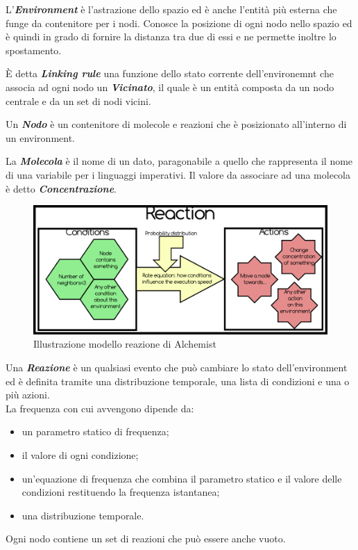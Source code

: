 L'\textbf{\textit{Environment}} \`e l'astrazione dello spazio ed \`e anche l'entit\`a pi\`u esterna che funge da contenitore per i nodi. Conosce la posizione di ogni nodo nello spazio ed \`e quindi in grado di fornire la distanza tra due di essi e ne permette inoltre lo spostamento.

\`E detta \textbf{\textit{Linking rule}} una funzione dello stato corrente dell'environemnt che associa ad ogni nodo un \textbf{\textit{Vicinato}}, il quale \`e un entit\`a composta da un nodo centrale e da un set di nodi vicini.

Un \textbf{\textit{Nodo}} \`e un contenitore di molecole e reazioni che \`e posizionato all'interno di un environment.

La \textbf{\textit{Molecola}} \`e il nome di un dato, paragonabile a quello che rappresenta il nome di una variabile per i linguaggi imperativi.
Il valore da associare ad una molecola \`e detto \textbf{\textit{Concentrazione}}.

\begin{figure}[h] %
\begin{center} %
\includegraphics[width=14cm]{images/AlchemistReaction.png} %
\caption[Illustrazione modello reazione di Alchemist]{Illustrazione modello reazione di Alchemist} \label{fig:alchemistReaction}
\end{center}
\end{figure}

Una \textbf{\textit{Reazione}} \`e un qualsiasi evento che pu\`o cambiare lo stato dell'environment ed \`e definita tramite una distribuzione temporale, una lista di condizioni e una o pi\`u azioni.
\\La frequenza con cui avvengono dipende da:
\begin{itemize}
\item un parametro statico di frequenza;
\item il valore di ogni condizione;
\item un'equazione di frequenza che combina il parametro statico e il valore delle condizioni restituendo la frequenza istantanea;
\item una distribuzione temporale.
\end{itemize}
Ogni nodo contiene un set di reazioni che pu\`o essere anche vuoto.

